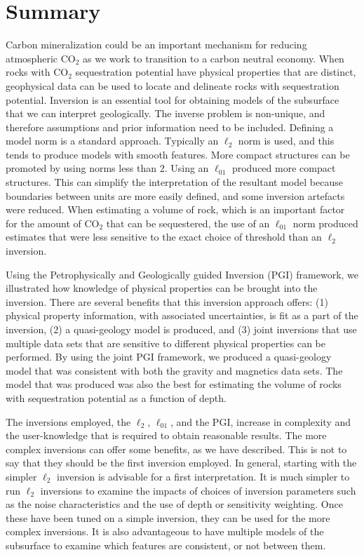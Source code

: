 \documentclass[
    paper,
  ]{geophysics}
\begin{document}





\section{Summary}
Carbon mineralization could be an important mechanism for reducing atmospheric CO$_2$ as we work to transition to a carbon neutral economy. When rocks with CO$_2$ sequestration potential have physical properties that are distinct, geophysical data can be used to locate and delineate rocks with sequestration potential. Inversion is an essential tool for obtaining models of the subsurface that we can interpret geologically. The inverse problem is non-unique, and therefore assumptions and prior information need to be included. Defining a model norm is a standard approach. Typically an $\ell_2$ norm is used, and this tends to produce models with smooth features. More compact structures can be promoted by using norms less than 2. Using an $\ell_{01}$ produced more compact structures. This can simplify the interpretation of the resultant model because boundaries between units are more easily defined, and some inversion artefacts were reduced. When estimating a volume of rock, which is an important factor for the amount of CO$_2$ that can be sequestered, the use of an $\ell_{01}$ norm produced estimates that were less sensitive to the exact choice of threshold than an $\ell_2$ inversion.

Using the Petrophysically and Geologically guided Inversion (PGI) framework, we illustrated how knowledge of physical properties can be brought into the inversion. There are several benefits that this inversion approach offers: (1) physical property information, with associated uncertainties, is fit as a part of the inversion, (2) a quasi-geology model is produced, and (3) joint inversions that use multiple data sets that are sensitive to different physical properties can be performed. By using the joint PGI framework, we produced a quasi-geology model that was consistent with both the gravity and magnetics data sets. The model that was produced was also the best for estimating the volume of rocks with sequestration potential as a function of depth.

The inversions employed, the $\ell_2$, $\ell_{01}$, and the PGI, increase in complexity and the user-knowledge that is required to obtain reasonable results. The more complex inversions can offer some benefits, as we have described. This is not to say that they should be the first inversion employed. In general, starting with the simpler $\ell_2$ inversion is advisable for a first interpretation. It is much simpler to run $\ell_2$ inversions to examine the impacts of choices of inversion parameters such as the noise characteristics and the use of depth or sensitivity weighting. Once these have been tuned on a simple inversion, they can be used for the more complex inversions. It is also advantageous to have multiple models of the subsurface to examine which features are consistent, or not between them.
\end{document}
